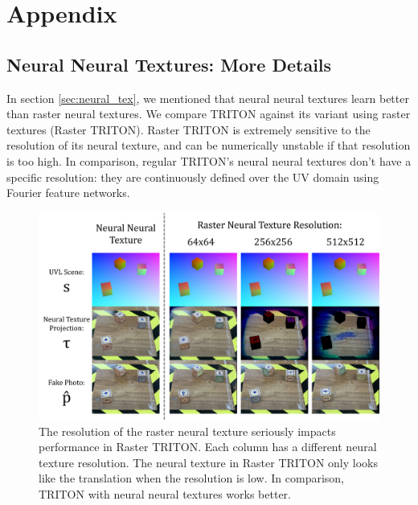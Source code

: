 \section{Appendix} 

\subsection{Neural Neural Textures: More Details}

	In section \ref{sec:neural_tex}, we mentioned that neural neural textures learn better than raster neural textures. 
	We compare TRITON against its variant using raster textures (Raster TRITON).
	Raster TRITON is extremely sensitive to the resolution of its neural texture, and can be numerically unstable if that resolution is too high.
	In comparison, regular TRITON's neural neural textures don't have a specific resolution: they are continuously defined over the UV domain using Fourier feature networks.

	\begin{figure}[H]
		\begin{center}
			\includegraphics[width=400pt]{../images/raster_texture_resolution_comparisons.pdf}
		\end{center}
		\caption{
			The resolution of the raster neural texture seriously impacts performance in Raster TRITON. Each column has a different neural texture resolution.
			The neural texture in Raster TRITON only looks like the translation when the resolution is low. In comparison, TRITON with neural neural textures works better.
		}
		\label{fig:raster_texture_resolution_comparisons}
	\end{figure}

